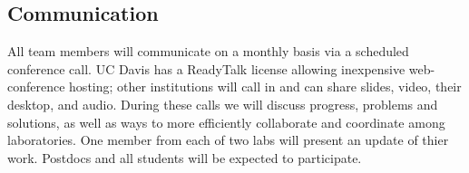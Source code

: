 \renewcommand{\thepage}{Management Plan - Page \arabic{page} of 3}

%
%

\subsection*{Communication} 

All team members will communicate on a monthly basis via a scheduled conference call. UC Davis has a ReadyTalk license allowing inexpensive web-conference hosting; other institutions will call in and can share slides, video, their desktop, and audio.  During these calls we will discuss progress, problems and solutions, as well as ways to more efficiently collaborate and coordinate among laboratories.  One member from each of two labs will present an update of thier work.  Postdocs and all students will be expected to participate.

